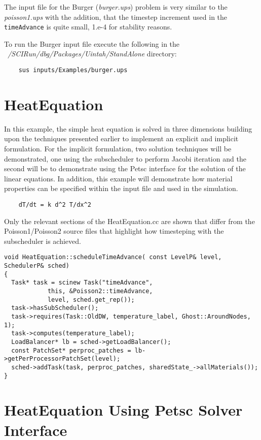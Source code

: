 \documentclass[12pt]{report}
\begin{document}
The input file for the Burger (\emph{burger.ups}) problem is very
similar to the \emph{poisson1.ups} with the addition, that the
timestep increment used in the \texttt{timeAdvance} is quite small,
1.e-4 for stability reasons.

To run the Burger input file execute the following in the
\emph{~/SCIRun/dbg/Packages/Uintah/StandAlone} directory:

\begin{verbatim}
	sus inputs/Examples/burger.ups
\end{verbatim}

\section{HeatEquation}

In this example, the simple heat equation is solved in three
dimensions building upon the techniques presented earlier to implement
an explicit and implicit formulation.  For the implicit formulation,
two solution techniques will be demonstrated, one using the
subscheduler to perform Jacobi iteration and the second will be to
demonstrate using the Petsc interface for the solution of the linear
equations.  In addition, this example will demonstrate how material
properties can be specified within the input file and used in the
simulation.

\begin{verbatim}
	dT/dt = k d^2 T/dx^2  
\end{verbatim}

Only the relevant sections of the HeatEquation.cc are shown that
differ from the Poisson1/Poisson2 source files that highlight how
timesteping with the subscheduler is achieved.

\begin{verbatim}
void HeatEquation::scheduleTimeAdvance( const LevelP& level, SchedulerP& sched)
{
  Task* task = scinew Task("timeAdvance",
			this, &Poisson2::timeAdvance,
			level, sched.get_rep());
  task->hasSubScheduler();
  task->requires(Task::OldDW, temperature_label, Ghost::AroundNodes, 1);
  task->computes(temperature_label);
  LoadBalancer* lb = sched->getLoadBalancer();
  const PatchSet* perproc_patches = lb->getPerProcessorPatchSet(level);
  sched->addTask(task, perproc_patches, sharedState_->allMaterials());
}

\end{verbatim}

\section{HeatEquation Using Petsc Solver Interface}
\end{document}
